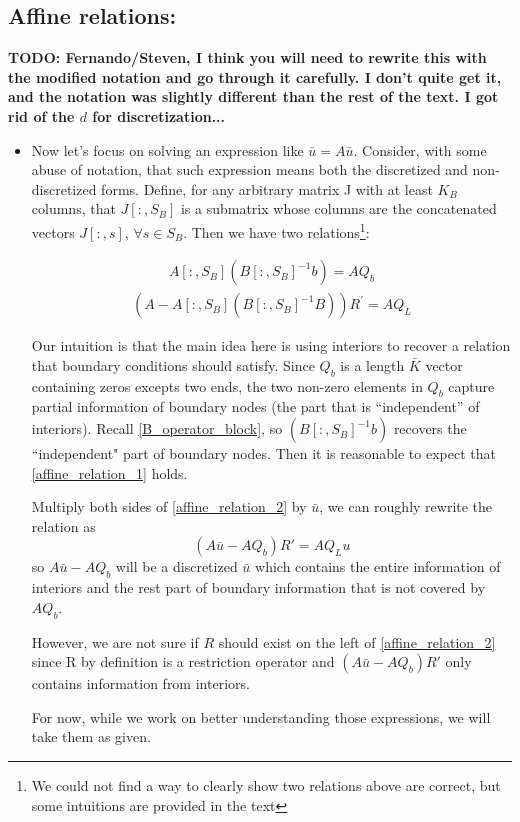 \documentclass[11pt]{article}
\begin{document}
		\subsection{Affine relations:}
		\textbf{TODO: Fernando/Steven, I think you will need to rewrite this with the modified notation and go through it carefully.  I don't quite get it, and the notation was slightly different than the rest of the text.  I got rid of the $d$ for discretization...}
		\begin{itemize}
			\item Now let's focus on solving an expression like $\bar{u} = A \bar{u}$. Consider, with some abuse of notation, that such expression means both the discretized and non-discretized forms. Define, for any arbitrary matrix J with at least $K_B$ columns, that $J[:,S_B]$ is a submatrix whose columns are the concatenated vectors $J[:,s]$, $\forall s \in S_B$.
			Then we have two relations\footnote{We could not find a way to clearly show two relations above are correct, but some intuitions are provided in the text}:

			\begin{align}
			A [:,S_B] \left(B[:,S_B]^{-1} b \right) = A  Q_b\label{affine_relation_1}
			\end{align}
			\begin{align}
			(A -A [:,S_B] (B[:,S_B]^{-1} B)) R^{'} = A  Q_L\label{affine_relation_2}
			\end{align}

			Our intuition is that the main idea here is using interiors to recover a relation that boundary conditions should satisfy. Since $Q_b$ is a length $\bar{K}$ vector containing zeros excepts two ends, the two non-zero elements in $Q_b$ capture partial information of boundary nodes (the part that is ``independent'' of interiors).  Recall \eqref{B_operator_block}, so $\left(B[:,S_B]^{-1} b \right)$ recovers the ``independent" part of boundary nodes. Then it is reasonable to expect that \eqref{affine_relation_1} holds.

			Multiply both sides of \eqref{affine_relation_2} by $\bar{u}$, we can roughly rewrite the relation as
			\begin{equation}
			(A \bar{u}-A  Q_b)  R' = A  Q_L u
			\end{equation}
			so $A \bar{u}-A   Q_b$ will be a discretized $\bar{u}$ which contains the entire information of interiors and the rest part of boundary information that is not covered by $A  Q_b$.

			However, we are not sure if $R$ should exist on the left of \eqref{affine_relation_2} since R by definition is a restriction operator and $(A  \bar{u}-A  Q_b) R'$ only contains information from interiors.
			\iffalse %
			Also the size of the LHS of \eqref{affine_relation_2} is $K\times \bar{K}$, but the size of the RHS is $\bar{I}\times I$ .
			\fi
			For now, while we work on better understanding those expressions, we will take them as given.



\end{itemize}
\end{document}
